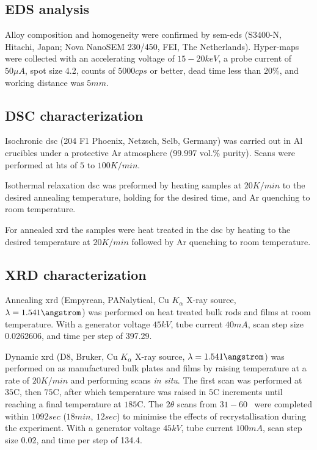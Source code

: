\documentclass[a4paper,12pt,oneside]{report}%
\begin{document}
\subsection{EDS analysis}
Alloy composition and homogeneity were confirmed by \acrshort{sem}-\acrshort{eds} (S3400-N, Hitachi, Japan; Nova NanoSEM 230/450, FEI, The Netherlands). Hyper-maps were collected with an accelerating voltage of $15-20keV$, a probe current of $50 \mu A$, spot size 4.2, counts of $5000cps$ or better, dead time less than 20\%, and working distance was $5mm$.

\subsection{DSC characterization}
Isochronic \acrshort{dsc} (204 F1 Phoenix, Netzsch, Selb, Germany) was carried out in Al crucibles under a protective Ar atmosphere (99.997 vol.\% purity). Scans were performed at \glspl{ht} of $5$ to $100 K/min$. 

Isothermal relaxation \acrshort{dsc} was preformed by heating samples at $20 K/min$ to the desired annealing temperature, holding for the desired time, and Ar quenching to room temperature.

For annealed \acrshort{xrd} the samples were heat treated in the \acrshort{dsc} by heating to the desired temperature at $20 K/min$ followed by Ar quenching to room temperature.

\subsection{XRD characterization}
Annealing \acrshort{xrd} (Empyrean, PANalytical, Cu $K_{\alpha}$ X-ray source, $\lambda = 1.541 \angstrom$) was performed on heat treated bulk rods and films at room temperature. 
With a generator voltage $45 kV$, tube current $40 mA$, scan step size 0.0262606, and time per step of 397.29. 

Dynamic \acrshort{xrd} (D8, Bruker, Cu $K_{\alpha}$ X-ray source, $\lambda = 1.541 \angstrom$) was performed on as manufactured bulk plates and films by raising temperature at a rate of $20 K/min$ and performing scans \textit{in situ}. The first scan was performed at $35$\degree C, then $75$\degree C, after which temperature was raised in $5$\degree C increments until reaching a final temperature at $185$\degree C. The $2 \theta$ scans from $31 - 60$\degree~ were completed within $1092 sec$ ($18min,~ 12sec$) to minimise the effects of recrystallisation during the experiment.
With a generator voltage $45 kV$, tube current $100 mA$, scan step size 0.02, and time per step of 134.4. 




\end{document}
